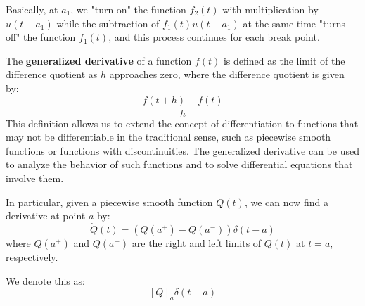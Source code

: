 Basically, at $a_1$, we "turn on" the function $f_2(t)$ with multiplication by $u(t - a_1)$ while the subtraction of $f_1(t) u(t - a_1)$ at the same time "turns off" the function $f_1(t)$, and this process continues for each break point.

{
The \textbf{generalized derivative} of a function $f(t)$ is defined as the limit of the difference quotient as $h$ approaches zero, where the difference quotient is given by:
\[
\frac{f(t + h) - f(t)}{h}
\]
This definition allows us to extend the concept of differentiation to functions that may not be differentiable in the traditional sense, such as piecewise smooth functions or functions with discontinuities. The generalized derivative can be used to analyze the behavior of such functions and to solve differential equations that involve them.
}

In particular, given a piecewise smooth function $Q(t)$, we can now find a derivative at point $a$ by:
\[
\dot{Q}(t) = (Q(a^+) - Q(a^-))\delta(t - a)
\]
where $Q(a^+)$ and $Q(a^-)$ are the right and left limits of $Q(t)$ at $t = a$, respectively.

We denote this as:
\[
\boxed{[Q]_a \delta (t - a)}
\]

